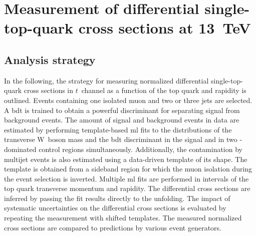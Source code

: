 \chapter{Measurement of differential single-top-quark cross sections at 13~TeV}
\label{ch:diff13}


\section{Analysis strategy}

In the following, the strategy for measuring normalized differential single-top-quark cross sections in $t$~channel as a function of the top quark \pt and rapidity is outlined. Events containing one isolated muon and two or three jets are selected. A \gls{bdt} is trained to obtain a powerful discriminant for separating signal from background events. The amount of signal and background events in data are estimated by performing template-based \gls{ml} fits to the distributions of the transverse W~boson mass and the \gls{bdt} discriminant in the signal and in two \ttbar-dominated control regions simultaneously. Additionally, the contamination by multijet events is also estimated using a data-driven template of its shape. The template is obtained from a sideband region for which the muon isolation during the event selection is inverted. Multiple \gls{ml} fits are performed in intervals of the top quark transverse momentum and rapidity. The differential cross sections are inferred by passing the fit results directly to the unfolding. The impact of systematic uncertainties on the differential cross sections is evaluated by repeating the measurement with shifted templates. The measured normalized cross sections are compared to predictions by various event generators.

